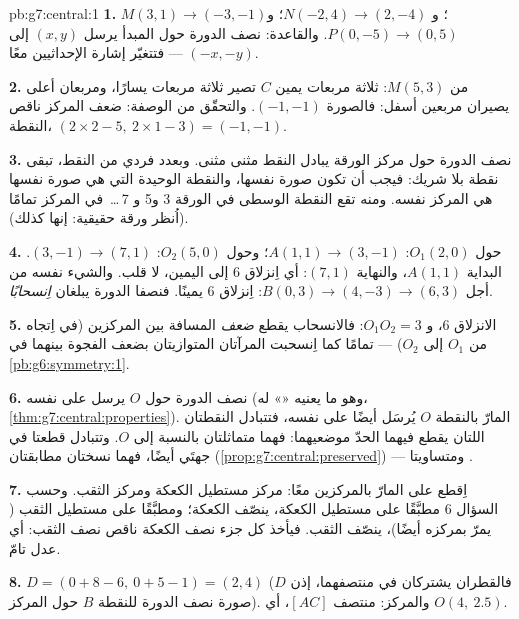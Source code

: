 \begin{solution}{pb:g7:central:1}
\textbf{1.} $M(3, 1) \to (-3, -1)$؛ و $N(-2, 4) \to (2, -4)$؛
و $P(0, -5) \to (0, 5)$. والقاعدة: نصف الدورة حول المبدأ
يرسل $(x, y)$ إلى $(-x, -y)$ --- فتتغيّر إشارة الإحداثيين معًا.

\textbf{2.} من $M(5, 3)$: ثلاثة مربعات يمين $C$ تصير
ثلاثة مربعات يسارًا، ومربعان أعلى يصيران مربعين أسفل: فالصورة
$(-1, -1)$. والتحقّق من الوصفة: ضعف المركز ناقص النقطة،
$(2 \times 2 - 5,\ 2 \times 1 - 3) = (-1, -1)$.

\textbf{3.} نصف الدورة حول مركز الورقة يبادل النقط
مثنى مثنى. وبعدد فردي من النقط، تبقى نقطة بلا شريك: فيجب
أن تكون صورة نفسها، والنقطة الوحيدة التي هي صورة نفسها
هي المركز نفسه. ومنه تقع النقطة الوسطى في الورقة 3 و5 و
7\,\dots\ في المركز تمامًا (اُنظر ورقة حقيقية: إنها كذلك).

\textbf{4.} حول $O_1(2,0)$: $A(1,1) \to (3,-1)$؛ وحول
$O_2(5,0)$: $(3,-1) \to (7,1)$. البداية $A(1,1)$، والنهاية
$(7,1)$: أي اِنزلاق $6$ إلى اليمين، لا قلب. والشيء نفسه من أجل
$B(0,3) \to (4,-3) \to (6,3)$: اِنزلاق $6$ يمينًا. فنصفا
الدورة يبلغان \emph{اِنسحابًا}.

\textbf{5.} الانزلاق $6$، و $O_1 O_2 = 3$: فالانسحاب
يقطع \emph{ضعف} المسافة بين المركزين (في
اِتجاه من $O_1$ إلى $O_2$) --- تمامًا كما اِنسحبت المرآتان المتوازيتان
بضعف الفجوة بينهما في \cref{pb:g6:symmetry:1}.

\textbf{6.} نصف الدورة حول $O$ يرسل  على
نفسه (وهو ما يعنيه «» له،
\cref{thm:g7:central:properties}).  المارّ بالنقطة $O$ يُرسَل
أيضًا على نفسه، فتتبادل النقطتان اللتان يقطع فيهما
الحدّ موضعيهما: فهما متماثلتان بالنسبة إلى $O$. وتتبادل
قطعتا  في جهتَي 
أيضًا، فهما نسختان مطابقتان (\cref{prop:g7:central:preserved})
--- ومتساويتا .

\textbf{7.} اِقطع على  المارّ بالمركزين معًا:
مركز مستطيل الكعكة ومركز الثقب.
وحسب السؤال 6 مطبَّقًا على مستطيل الكعكة، ينصّف 
الكعكة؛ ومطبَّقًا على مستطيل الثقب ( يمرّ
بمركزه أيضًا)، ينصّف الثقب. فيأخذ كل جزء نصف الكعكة
ناقص نصف الثقب: أي عدل تامّ.

\textbf{8.} $D = (0 + 8 - 6,\ 0 + 5 - 1) = (2, 4)$ (فالقطران
يشتركان في منتصفهما، إذن $D$ صورة نصف الدورة للنقطة
$B$ حول المركز). والمركز: منتصف $[AC]$، أي
$O(4,\ 2.5)$.


\end{solution}
